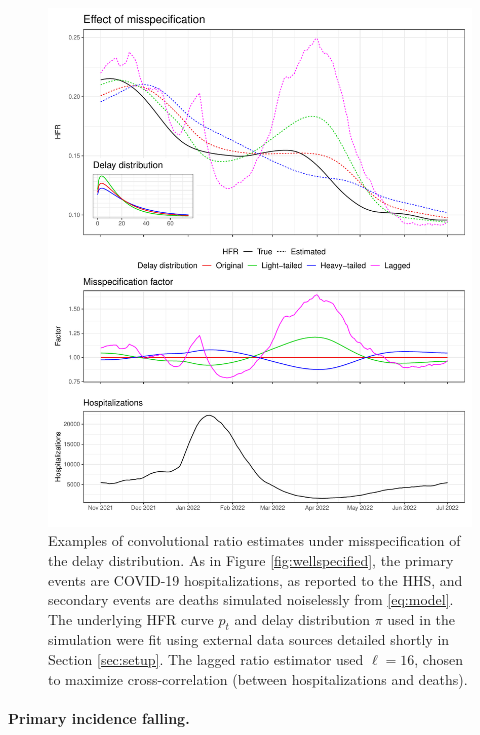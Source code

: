 \documentclass{article}
\begin{document}
\begin{figure}[p]
\centering
\includegraphics[width=0.9\linewidth]{Figures/Simulated/toy_misp.pdf}
\caption{Examples of convolutional ratio estimates under misspecification of the
  delay distribution.
  As in Figure \ref{fig:wellspecified}, the primary events are COVID-19
  hospitalizations, as reported to the HHS, and secondary events are deaths 
  simulated noiselessly from \eqref{eq:model}. The underlying HFR curve $p_t$
  and delay distribution $\pi$ used in the simulation were fit using external
  data sources detailed shortly in Section \ref{sec:setup}. The lagged ratio
  estimator used $\ell=16$, chosen to maximize cross-correlation (between
  hospitalizations and deaths).} 
\label{fig:misspecified}
\end{figure}

\paragraph{Primary incidence falling.}
\end{document}
